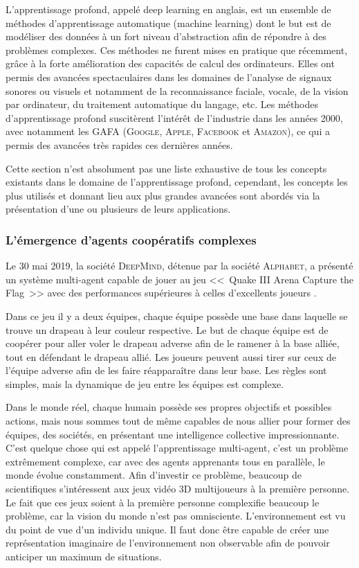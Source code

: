 L'apprentissage profond, appelé deep learning en anglais, est un ensemble de méthodes d'apprentissage automatique (machine learning) dont le but est de modéliser des données à un fort niveau d'abstraction afin de répondre à des problèmes complexes.
Ces méthodes ne furent mises en pratique que récemment, grâce à la forte amélioration des capacités de calcul des ordinateurs.
Elles ont permis des avancées spectaculaires dans les domaines de l'analyse de signaux sonores ou visuels et notamment de la reconnaissance faciale, vocale, de la vision par ordinateur, du traitement automatique du langage, etc.
Les méthodes d'apprentissage profond suscitèrent l'intérêt de l'industrie dans les années 2000, avec notamment les GAFA (\textsc{Google}, \textsc{Apple}, \textsc{Facebook} et \textsc{Amazon}), ce qui a permis des avancées très rapides ces dernières années.

Cette section n'est absolument pas une liste exhaustive de tous les concepts existants dans le domaine de l'apprentissage profond, cependant, les concepts les plus utilisés et donnant lieu aux plus grandes avancées sont abordés via la présentation d'une ou plusieurs de leurs applications.

\subsubsection{L'émergence d'agents coopératifs complexes}

Le 30 mai 2019, la société \textsc{DeepMind}, détenue par la société \textsc{Alphabet}, a présenté un système multi-agent capable de jouer au jeu <<~Quake III Arena Capture the Flag~>> avec des performances supérieures à celles d'excellents joueurs \cite{deepmind_ctf}.

Dans ce jeu il y a deux équipes, chaque équipe possède une base dans laquelle se trouve un drapeau à leur couleur respective.
Le but de chaque équipe est de coopérer pour aller voler le drapeau adverse afin de le ramener à la base alliée, tout en défendant le drapeau allié.
Les joueurs peuvent aussi tirer sur ceux de l'équipe adverse afin de les faire réapparaître dans leur base.
Les règles sont simples, mais la dynamique de jeu entre les équipes est complexe.

Dans le monde réel, chaque humain possède ses propres objectifs et possibles actions, mais nous sommes tout de même capables de nous allier pour former des équipes, des sociétés, en présentant une intelligence collective impressionnante.
C'est quelque chose qui est appelé l'apprentissage multi-agent, c'est un problème extrêmement complexe, car avec des agents apprenants tous en parallèle, le monde évolue constamment.
Afin d'investir ce problème, beaucoup de scientifiques s'intéressent aux jeux vidéo 3D multijoueurs à la première personne.
Le fait que ces jeux soient à la première personne complexifie beaucoup le problème, car la vision du monde n'est pas omnisciente.
L'environnement est vu du point de vue d'un individu unique.
Il faut donc être capable de créer une représentation imaginaire de l'environnement non observable afin de pouvoir anticiper un maximum de situations.

